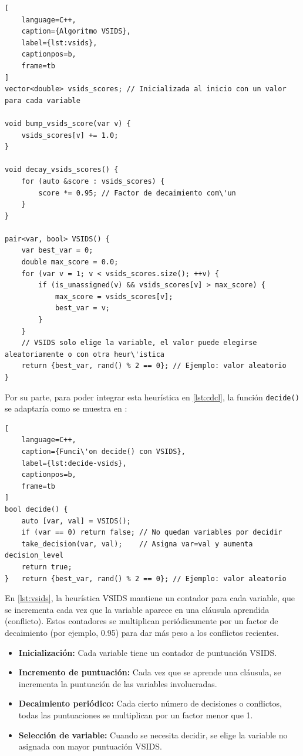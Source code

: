 \begin{lstlisting}[
    language=C++,
    caption={Algoritmo VSIDS},
    label={lst:vsids},
    captionpos=b,
    frame=tb
]
vector<double> vsids_scores; // Inicializada al inicio con un valor para cada variable

void bump_vsids_score(var v) {
    vsids_scores[v] += 1.0;
}

void decay_vsids_scores() {
    for (auto &score : vsids_scores) {
        score *= 0.95; // Factor de decaimiento com\'un
    }
}

pair<var, bool> VSIDS() {
    var best_var = 0;
    double max_score = 0.0;
    for (var v = 1; v < vsids_scores.size(); ++v) {
        if (is_unassigned(v) && vsids_scores[v] > max_score) {
            max_score = vsids_scores[v];
            best_var = v;
        }
    }
    // VSIDS solo elige la variable, el valor puede elegirse aleatoriamente o con otra heur\'istica
    return {best_var, rand() % 2 == 0}; // Ejemplo: valor aleatorio
}

\end{lstlisting}

Por su parte, para poder integrar esta heur\'istica en \ref{lst:cdcl}, la funci\'on \texttt{decide()} se adaptar\'ia como se muestra en :

\begin{lstlisting}[
    language=C++,
    caption={Funci\'on decide() con VSIDS},
    label={lst:decide-vsids},
    captionpos=b,
    frame=tb
]
bool decide() {
    auto [var, val] = VSIDS();
    if (var == 0) return false; // No quedan variables por decidir
    take_decision(var, val);    // Asigna var=val y aumenta decision_level
    return true;
}   return {best_var, rand() % 2 == 0}; // Ejemplo: valor aleatorio

\end{lstlisting}

En \ref{lst:vsids}, la heurística VSIDS mantiene un contador para cada variable, que se incrementa cada vez que la variable aparece en una cláusula aprendida (conflicto). Estos contadores se multiplican periódicamente por un factor de decaimiento (por ejemplo, 0.95) para dar más peso a los conflictos recientes.

\begin{itemize}
    \item \textbf{Inicialización:} Cada variable tiene un contador de puntuación VSIDS.
    \item \textbf{Incremento de puntuación:} Cada vez que se aprende una cláusula, se incrementa la puntuación de las variables involucradas.
    \item \textbf{Decaimiento periódico:} Cada cierto número de decisiones o conflictos, todas las puntuaciones se multiplican por un factor menor que 1.
    \item \textbf{Selección de variable:} Cuando se necesita decidir, se elige la variable no asignada con mayor puntuación VSIDS.
\end{itemize}

